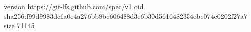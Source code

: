 version https://git-lfs.github.com/spec/v1
oid sha256:f99d9983dc6a0e4a276bb8bc606488d3e6b30d5616482354ebe074c0202f27a7
size 71145
